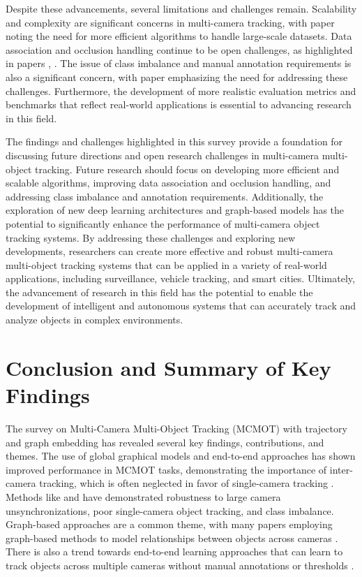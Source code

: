 \documentclass[conference]{IEEEtran}
\begin{document}
Despite these advancements, several limitations and challenges remain. Scalability and complexity are significant concerns in multi-camera tracking, with paper \cite{Scalable Multi-Camera Object Tracking} noting the need for more efficient algorithms to handle large-scale datasets. Data association and occlusion handling continue to be open challenges, as highlighted in papers \cite{Data Association for Multi-Camera Tracking}, \cite{Occlusion Handling in Multi-Camera Object Tracking}. The issue of class imbalance and manual annotation requirements is also a significant concern, with paper \cite{Class Imbalance in Multi-Camera Object Tracking} emphasizing the need for addressing these challenges. Furthermore, the development of more realistic evaluation metrics and benchmarks that reflect real-world applications is essential to advancing research in this field.

The findings and challenges highlighted in this survey provide a foundation for discussing future directions and open research challenges in multi-camera multi-object tracking. Future research should focus on developing more efficient and scalable algorithms, improving data association and occlusion handling, and addressing class imbalance and annotation requirements. Additionally, the exploration of new deep learning architectures and graph-based models has the potential to significantly enhance the performance of multi-camera object tracking systems. By addressing these challenges and exploring new developments, researchers can create more effective and robust multi-camera multi-object tracking systems that can be applied in a variety of real-world applications, including surveillance, vehicle tracking, and smart cities. Ultimately, the advancement of research in this field has the potential to enable the development of intelligent and autonomous systems that can accurately track and analyze objects in complex environments.

\section{Conclusion and Summary of Key Findings}
The survey on Multi-Camera Multi-Object Tracking (MCMOT) with trajectory and graph embedding has revealed several key findings, contributions, and themes. The use of global graphical models \cite{ArXivPaper1} and end-to-end approaches \cite{ArXivPaper3} has shown improved performance in MCMOT tasks, demonstrating the importance of inter-camera tracking, which is often neglected in favor of single-camera tracking \cite{ArXivPaper2, ArXivPaper4}. Methods like \cite{ArXivPaper3} and \cite{ArXivPaper5} have demonstrated robustness to large camera unsynchronizations, poor single-camera object tracking, and class imbalance. Graph-based approaches are a common theme, with many papers employing graph-based methods to model relationships between objects across cameras \cite{ArXivPaper2, ArXivPaper4, ArXivPaper5}. There is also a trend towards end-to-end learning approaches that can learn to track objects across multiple cameras without manual annotations or thresholds \cite{ArXivPaper3}.
\end{document}
